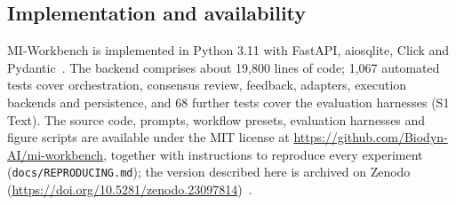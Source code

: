 \subsection*{Implementation and availability}

MI-Workbench is implemented in Python 3.11 with FastAPI, aiosqlite, Click and Pydantic~\cite{pydantic}. The backend comprises about 19,800 lines of code; 1,067 automated tests cover orchestration, consensus review, feedback, adapters, execution backends and persistence, and 68 further tests cover the evaluation harnesses (S1 Text). The source code, prompts, workflow presets, evaluation harnesses and figure scripts are available under the MIT license at \url{https://github.com/Biodyn-AI/mi-workbench}, together with instructions to reproduce every experiment (\texttt{docs/REPRODUCING.md}); the version described here is archived on Zenodo (\url{https://doi.org/10.5281/zenodo.23097814})~\cite{kendiukhov2026miworkbench}.
